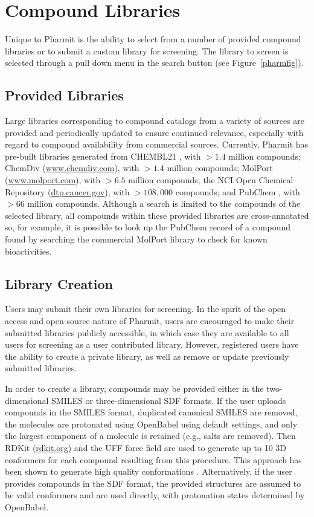 \section{Compound Libraries}

Unique to Pharmit is the ability to select from a number of provided compound libraries or to submit a custom library for screening.  The library to screen is selected through a pull down menu in the search button (see Figure~\ref{pharmfig}).  

\subsection{Provided Libraries}

Large libraries corresponding to compound catalogs from a variety of sources are provided and periodically updated to ensure continued relevance, especially with regard to compound availability from commercial sources.  Currently, Pharmit has pre-built libraries generated from CHEMBL21 \cite{Gaulton_2011}, with $>1.4$ million compounds; ChemDiv (\url{www.chemdiv.com}), with $>1.4$ million compounds; MolPort (\url{www.molport.com}), with $>6.5$ million compounds; the NCI Open Chemical Repository (\url{dtp.cancer.gov}), with $>108,000$ compounds; and PubChem \cite{Kim_2015}, with $>66$ million compounds. 
 Although a search is limited to the compounds of the selected library, all compounds within these provided libraries are cross-annotated so, for example, it is possible to look up the PubChem record of a compound found by searching the commercial MolPort library to check for known bioactivities.


\subsection{Library Creation}

Users may submit their own libraries for screening.  In the spirit of the open access and open-source nature of Pharmit, users are encouraged to make their submitted libraries publicly accessible, in which case they are available to all users for screening as a user contributed library.  However, registered users have the ability to create a private library, as well as remove or update previously submitted libraries. 

In order to create a library, compounds may be provided either in the two-dimensional SMILES or three-dimensional SDF formats.  If the user uploads compounds in the SMILES format, duplicated canonical SMILES are removed, the molecules are protonated using OpenBabel \cite{O_Boyle_2011} using default settings, and only the largest component of a molecule is retained (e.g., salts are removed).  Then RDKit (\url{rdkit.org}) and the UFF force field \cite{Rappe_1992} are used to generate up to 10 3D conformers for each compound resulting from this procedure.  This approach has been shown to generate high quality conformations \cite{Ebejer_2012}.  Alternatively, if the user provides compounds in the SDF format, the provided structures are assumed to be valid conformers and are used directly, with protonation states determined by OpenBabel.
